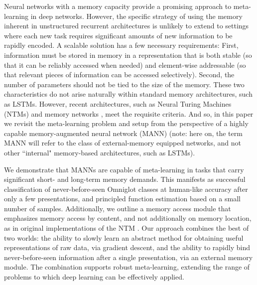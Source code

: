 \documentclass{article}
\begin{document}
Neural networks with a memory capacity provide a promising approach to meta-learning in deep networks. However, the specific strategy of using the memory inherent in unstructured recurrent architectures is unlikely to extend to settings where each new task requires significant amounts of new information to be rapidly encoded. A scalable solution has a few necessary requirements: First, information must be stored in memory in a representation that is both stable (so that it can be reliably accessed when needed) and element-wise addressable (so that relevant pieces of information can be accessed selectively). Second, the number of parameters should not be tied to the size of the memory. These two characteristics do not arise naturally within standard memory architectures, such as LSTMs. However, recent architectures, such as Neural Turing Machines (NTMs) \cite{graves2014neural} and memory networks \cite{weston2014memory}, meet the requisite criteria. And so, in this paper we revisit the meta-learning problem and setup from the perspective of a highly capable memory-augmented neural network (MANN) (note: here on, the term MANN will refer to the class of external-memory equipped networks, and not other ``internal" memory-based architectures, such as LSTMs). 

We demonstrate that MANNs are capable of meta-learning in tasks that carry significant short- and long-term memory demands. This manifests as successful classification of never-before-seen Omniglot classes at human-like accuracy after only a few presentations, and principled function estimation based on a small number of samples. Additionally, we outline a memory access module that emphasizes memory access by content, and not additionally on memory location, as in original implementations of the NTM \cite{graves2014neural}. Our approach combines the best of two worlds: the ability to slowly learn an abstract method for obtaining useful representations of raw data, via gradient descent, and the ability to rapidly bind never-before-seen information after a single presentation, via an external memory module. The combination supports robust meta-learning, extending the range of problems to which deep learning can be effectively applied.  
\end{document}
